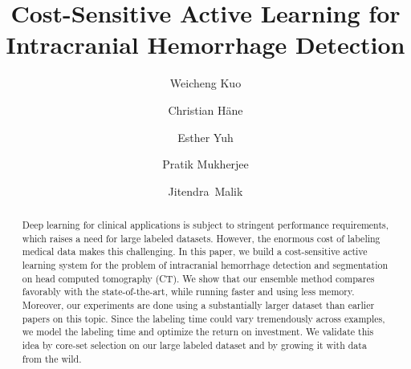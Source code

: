 \documentclass{llncs}
\begin{document}
%
\frontmatter          %
%
\pagestyle{headings}  %
%
\mainmatter              %
%
\title{Cost-Sensitive Active Learning for Intracranial Hemorrhage Detection}

\author{Weicheng Kuo \and
Christian H{\"a}ne\and
Esther Yuh  \and
Pratik Mukherjee \and
Jitendra~Malik}
%
%
%

\maketitle              %

\begin{abstract}

Deep learning for clinical applications is subject to stringent performance requirements, which raises a need for large labeled datasets. However, the enormous cost of labeling medical data makes this challenging. In this paper, we build a cost-sensitive active learning system for the problem of intracranial hemorrhage detection and segmentation on head computed tomography (CT).  We show that our ensemble method compares favorably with the state-of-the-art, while running faster and using less memory. Moreover, our experiments are done using a substantially larger dataset than earlier papers on this topic. Since the labeling time could vary tremendously across examples, we model the labeling time and optimize the return on investment. We validate this idea by core-set selection on our large labeled dataset and by growing it with data from the wild. 

\end{abstract}
%

\vspace*{-0.5cm}
\end{document}

